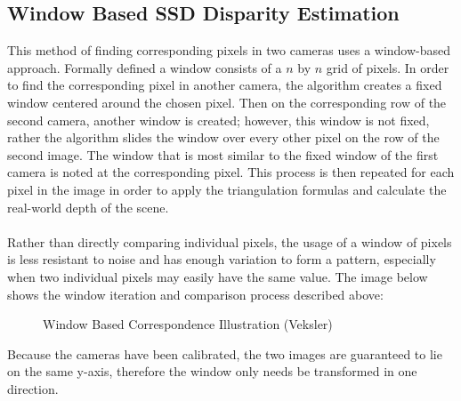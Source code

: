 \documentclass[11pt]{scrartcl}
\begin{document}
\subsection{Window Based SSD Disparity Estimation}
This method of finding corresponding pixels in two cameras uses a window-based approach. Formally defined a window consists of a $n$ by $n$ grid of pixels. In order to find the corresponding pixel in another camera, the algorithm creates a fixed window centered around the chosen pixel. 
Then on the corresponding row of the second camera, another window is created; however, 
this window is not fixed, rather the algorithm slides the window over every other pixel on the row of the second image. The window that is most similar to the fixed window of the first camera is noted at the corresponding pixel. This process is then repeated for each pixel in the image in order to apply the triangulation formulas and calculate the 
real-world depth of the scene. 
\\
\\
\newpage
Rather than directly comparing individual pixels, the usage of a window of pixels is less resistant to noise and has enough variation to form a pattern, especially when two individual pixels may easily have the same value. The image below shows the window iteration and comparison process described above:

\begin{figure}[!htb]
	\centering
	\caption{Window Based Correspondence Illustration (Veksler)}
\end{figure}


\begin{remark}
	Because the cameras have been calibrated, the two images are guaranteed to lie 
	on the same y-axis, therefore the window only needs be transformed in one 
	direction. 
\end{remark}
\\
\end{document}
